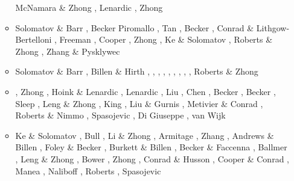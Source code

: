 \begin{itemize}
\begin{scriptsize}
\begin{itemize}
                    McNamara \& Zhong \cite{mczh05a}\cite{mczh05b},
                    Lenardic \etal \cite{lemj05}, Zhong \cite{zhon05}
\item[\twothousandsix] Solomatov \& Barr \cite{soba06}, Becker \cite{beck06}
                    Piromallo \etal \cite{pibf06}, Tan \etal \cite{tact06},
                    Becker \etal \cite{besb06}, Conrad \& Lithgow-Bertelloni \cite{coli06},
                    Freeman \etal \cite{frmm06}, Cooper \etal \cite{colm06},
                    Zhong \cite{zhon06}, Ke \& Solomatov \cite{keso06},
                    Roberts \& Zhong \cite{rozh06}, Zhang \& Pysklywec \cite{zhpy06}


\item[\twothousandseven] Solomatov \& Barr \cite{soba07}, Billen \& Hirth \cite{bihi07},
                   \cite{zhzl07}, \cite{magu07},
                   \cite{bavi07}, \cite{rimb07},
                   \cite{mofm07}, \cite{cobs07},
                   \cite{qums07}, \cite{huda07},
                   Roberts \& Zhong \cite{rozh07}


\item[\twothousandeight] \cite{gamc08},
                    Zhong \etal \cite{zhmt08}, Hoink \& Lenardic \cite{hole08},
                    Lenardic \etal \cite{lejm08}, Liu \etal \cite{lisg08},
                    Chen \etal \cite{chzy08}, Becker \etal \cite{beke08},
                    Becker \cite{beck08}, Sleep \cite{slee08},
                    Leng \& Zhong \cite{lezh08}, King \cite{king08},
                    Liu \& Gurnis \cite{ligu08}, Metivier \& Conrad \cite{meco08},
                    Roberts \& Nimmo \cite{roni08}, Spasojevic \etal \cite{splg08},
                    Di Giuseppe \etal \cite{divf08}, van Wijk \etal \cite{vavg08}

\item[\twothousandnine] Ke \& Solomatov \cite{keso09}, Bull \etal \cite{bumr09}, 
                    Li \& Zhong \cite{lizh09}, Armitage \etal \cite{arhm09},
                    Zhang \etal \cite{zhzm09}, Andrews \& Billen \cite{anbi09},
                    Foley \& Becker \cite{fobe09}, Burkett \& Billen \cite{bubi09},
                    Becker \& Faccenna \cite{befa09}, Ballmer \etal \cite{bavi09},
                    Leng \& Zhong \cite{lezh09}, Bower \etal \cite{bogj09},
                    Zhong \cite{zhon09}, Conrad \& Husson \cite{cohu09},
                    Cooper \& Conrad \cite{coco09}, Manea \etal \cite{maml09},
                    Naliboff \etal \cite{nacl09}, Roberts \etal \cite{rolm09},
                    Spasojevic \etal \cite{splg09}


\end{itemize}
\end{scriptsize}
\end{itemize}
